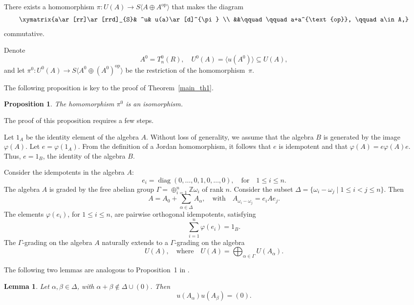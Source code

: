 \documentclass[12pt]{amsart}
\newtheorem{prop}{Proposition}
\newtheorem{lem}{Lemma}
\begin{document}
{There  exists a homomorphism $
\pi: U(A) \to S\langle A\oplus A^{\text{op}}\rangle$ that makes the diagram 
$$
\xymatrix{a\ar[rr]\ar[rrd]_{S}& ^u&
	u(a)\ar[d]^{\pi}  
	\\ &&\qquad \qquad a+a^{\text{op}}, \qquad a\in A,} $$
commutative.

Denote $$A^0 = T_n^0 (R), \quad U^0(A)=\langle   u(A^0)\rangle \subseteq U(A),$$ and let $\pi^0: U^0 (A) \to S\langle   A^0\oplus (A^0)^{\text{op}}\rangle$ be the restriction of the homomorphism~$\pi.$

The following proposition is key to the proof of Theorem~\ref{main_th1}.

\begin{prop}\label{P1}
	The homomorphism \( \pi^0 \) is an isomorphism.
\end{prop}
The proof of this proposition requires a few steps.

Let $1_A$ be the identity element of the algebra $A$. Without loss of generality, we assume that the algebra $B$ is generated by the image $\varphi(A).$  Let $e=\varphi(1_A).$ From the definition of a Jordan homomorphism, it follows that $e$ is  idempotent and that $\varphi(A) = e\varphi(A) e.$ Thus, $e=1_B$, the  identity of the algebra $B$.


Consider the idempotents in the algebra $A$: \[ e_i = \operatorname{diag}(0, \ldots, 0, 1, 0, \ldots, 0) , \quad \text{for} \quad 1 \leq i \leq n .\]   The algebra \( A \) is graded by the free abelian group  
\( \Gamma = \oplus _{i=1}^{n} \mathbb{Z} \omega_i \) of rank \( n \). Consider the subset  $
\Delta = \{ \omega_i - \omega_j \mid 1 \leq i < j \leq n \}.$
Then  
\[
A = A_0 + \sum_{\alpha \in \Delta} A_\alpha, \quad \text{with} \quad A_{ \omega_i - \omega_j } = e_i A e_j.
\]
The elements \( \varphi(e_i) \),  for \( 1 \leq i \leq n \), are pairwise orthogonal idempotents, satisfying
\[
\sum_{i=1}^n \varphi(e_i) = 1_B.
\] The \( \Gamma \)-grading on the algebra \( A \) naturally extends to a \( \Gamma \)-grading on the algebra  
\[
U(A), \quad \text{where} \quad U(A) = \bigoplus_{\alpha \in \Gamma} U(A_\alpha).
\]

The following two lemmas are analogous to Proposition~1 in \cite{Bezushchak_Kashuba_Zelmanov}.

\begin{lem}\label{L1} Let \( \alpha, \beta \in \Delta \), with \( \alpha + \beta \not\in \Delta \cup (0)\). Then  
\[
u(A_\alpha) u(A_\beta) = (0).
\] \end{lem}

}
\end{document}
